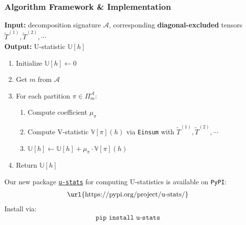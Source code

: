 \documentclass[9pt]{beamer}
\def\tilde{\widetilde}
\def\calA{\mathcal{A}}
\theoremstyle{mystyle}
\theoremstyle{mystyletwo}
\def\tilde{\widetilde}
\newcommand{\libref}[2]{\href{#2}{\texttt{#1}}}
\newcommand{\ustat}{\mathbb{U}}
\newcommand{\vstat}{\mathbb{V}}
\newcommand{\partition}{\Pi}
\newcommand{\partitionp}[1]{\partition_{#1}}
\def\package{\libref{u-stats}{https://github.com/Amedar-Asterisk/U-Statistics-python}}
\begin{document}
\begin{frame}
\frametitle{Algorithm Framework \& Implementation}

\begin{center}
\begin{minipage}{1.0\textwidth}

\begin{tcolorbox}[colback=white,colframe=blue!50!black,title=Updated Algorithm Framework]
\begin{flushleft}
\textbf{Input:} decomposition signature $\calA$, corresponding \textbf{diagonal-excluded} tensors $\tilde{T}^{(1)}, \tilde{T}^{(2)},\cdots$ \\
\textbf{Output:} U-statistic $\ustat[h]$
\end{flushleft}

\vspace{0.2cm}
\begin{enumerate}
    \item Initialize $\ustat[h] \gets 0$
    \item Get $m$ from $\calA$
    \item For each partition $\pi \in \partitionp{m}^{\calA}$:
    \begin{enumerate}
        \item Compute coefficient $\mu_{\pi}$
        \item Compute V-statistic $\vstat[\pi](h)$ via \texttt{Einsum} with $\tilde{T}^{(1)}, \tilde{T}^{(2)},\cdots$
        \item $\ustat[h] \gets \ustat[h] + \mu_{\pi} \cdot \vstat[\pi](h)$
    \end{enumerate}
    \item Return $\ustat[h]$
\end{enumerate}
\end{tcolorbox}


\begin{flushleft}
Our new package \package{} for computing U-statistics is available on \texttt{PyPI}: 
\begin{align*}
\text{\url{https://pypi.org/project/u-stats/}}
\end{align*}
Install via:
\begin{align*}
\texttt{pip install u-stats}
\end{align*}
\end{flushleft}

\end{minipage}
\end{center}

\end{frame}
\end{document}
